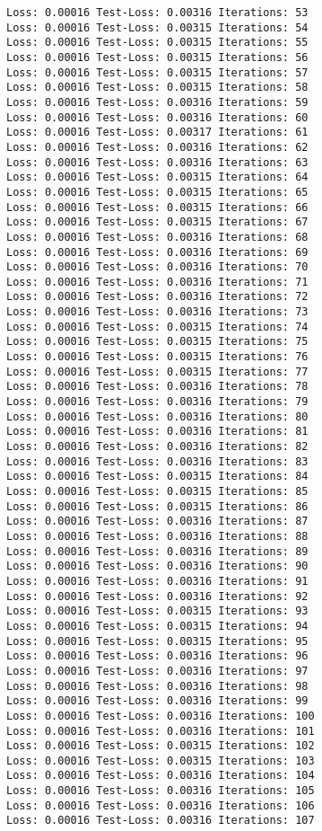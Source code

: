 \documentclass[11pt]{article}
\begin{document}
\begin{Verbatim}[commandchars=\\\{\}]
Loss: 0.00016 Test-Loss: 0.00316 Iterations: 53
Loss: 0.00016 Test-Loss: 0.00315 Iterations: 54
Loss: 0.00016 Test-Loss: 0.00315 Iterations: 55
Loss: 0.00016 Test-Loss: 0.00315 Iterations: 56
Loss: 0.00016 Test-Loss: 0.00315 Iterations: 57
Loss: 0.00016 Test-Loss: 0.00315 Iterations: 58
Loss: 0.00016 Test-Loss: 0.00316 Iterations: 59
Loss: 0.00016 Test-Loss: 0.00316 Iterations: 60
Loss: 0.00016 Test-Loss: 0.00317 Iterations: 61
Loss: 0.00016 Test-Loss: 0.00316 Iterations: 62
Loss: 0.00016 Test-Loss: 0.00316 Iterations: 63
Loss: 0.00016 Test-Loss: 0.00315 Iterations: 64
Loss: 0.00016 Test-Loss: 0.00315 Iterations: 65
Loss: 0.00016 Test-Loss: 0.00315 Iterations: 66
Loss: 0.00016 Test-Loss: 0.00315 Iterations: 67
Loss: 0.00016 Test-Loss: 0.00316 Iterations: 68
Loss: 0.00016 Test-Loss: 0.00316 Iterations: 69
Loss: 0.00016 Test-Loss: 0.00316 Iterations: 70
Loss: 0.00016 Test-Loss: 0.00316 Iterations: 71
Loss: 0.00016 Test-Loss: 0.00316 Iterations: 72
Loss: 0.00016 Test-Loss: 0.00316 Iterations: 73
Loss: 0.00016 Test-Loss: 0.00315 Iterations: 74
Loss: 0.00016 Test-Loss: 0.00315 Iterations: 75
Loss: 0.00016 Test-Loss: 0.00315 Iterations: 76
Loss: 0.00016 Test-Loss: 0.00315 Iterations: 77
Loss: 0.00016 Test-Loss: 0.00316 Iterations: 78
Loss: 0.00016 Test-Loss: 0.00316 Iterations: 79
Loss: 0.00016 Test-Loss: 0.00316 Iterations: 80
Loss: 0.00016 Test-Loss: 0.00316 Iterations: 81
Loss: 0.00016 Test-Loss: 0.00316 Iterations: 82
Loss: 0.00016 Test-Loss: 0.00316 Iterations: 83
Loss: 0.00016 Test-Loss: 0.00315 Iterations: 84
Loss: 0.00016 Test-Loss: 0.00315 Iterations: 85
Loss: 0.00016 Test-Loss: 0.00315 Iterations: 86
Loss: 0.00016 Test-Loss: 0.00316 Iterations: 87
Loss: 0.00016 Test-Loss: 0.00316 Iterations: 88
Loss: 0.00016 Test-Loss: 0.00316 Iterations: 89
Loss: 0.00016 Test-Loss: 0.00316 Iterations: 90
Loss: 0.00016 Test-Loss: 0.00316 Iterations: 91
Loss: 0.00016 Test-Loss: 0.00316 Iterations: 92
Loss: 0.00016 Test-Loss: 0.00315 Iterations: 93
Loss: 0.00016 Test-Loss: 0.00315 Iterations: 94
Loss: 0.00016 Test-Loss: 0.00315 Iterations: 95
Loss: 0.00016 Test-Loss: 0.00316 Iterations: 96
Loss: 0.00016 Test-Loss: 0.00316 Iterations: 97
Loss: 0.00016 Test-Loss: 0.00316 Iterations: 98
Loss: 0.00016 Test-Loss: 0.00316 Iterations: 99
Loss: 0.00016 Test-Loss: 0.00316 Iterations: 100
Loss: 0.00016 Test-Loss: 0.00316 Iterations: 101
Loss: 0.00016 Test-Loss: 0.00315 Iterations: 102
Loss: 0.00016 Test-Loss: 0.00315 Iterations: 103
Loss: 0.00016 Test-Loss: 0.00316 Iterations: 104
Loss: 0.00016 Test-Loss: 0.00316 Iterations: 105
Loss: 0.00016 Test-Loss: 0.00316 Iterations: 106
Loss: 0.00016 Test-Loss: 0.00316 Iterations: 107

\end{Verbatim}
\end{document}
